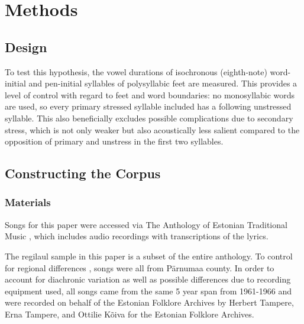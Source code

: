 \chapter{Methods}
%

\section{Design}
To test this hypothesis, the vowel durations of isochronous (eighth-note) word-initial and pen-initial syllables of polysyllabic feet are measured. This provides a level of control with regard to feet and word boundaries: no monosyllabic words are used, so every primary stressed syllable included has a following unstressed syllable. This also beneficially excludes possible complications due to secondary stress, which is not only weaker but also acoustically less salient \cite{asuLippus2018} compared to the opposition of primary and unstress in the first two syllables. 



%


\section{Constructing the Corpus}



\subsection{Materials}

Songs for this paper were accessed via The Anthology of Estonian Traditional Music \citep{tampere2016}, which includes audio recordings with transcriptions of the lyrics. 


The regilaul sample in this paper is a subset of the entire anthology. To control for regional differences \citep{whyRegion},  songs were all from Pärnumaa county. In order to account for diachronic variation \citep{whyDecade} as well as possible differences due to recording equipment used, all songs came from the same 5 year span from 1961-1966 and were recorded on behalf of the Estonian Folklore Archives by Herbert Tampere, Erna Tampere, and Ottilie Kõiva for the Estonian Folklore Archives\citep{oras2002, tampere2016}. 




